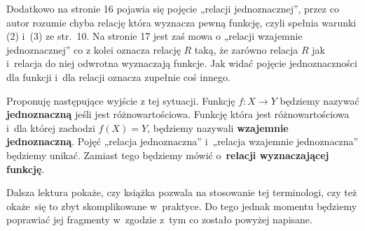 \documentclass[a4paper,11pt]{article}
\numberwithin{equation}{section}
\begin{document}
Dodatkowo na stronie 16 pojawia się pojęcie „relacji jednoznacznej”,
przez co autor rozumie chyba relację która wyznacza pewną funkcję,
czyli spełnia warunki (2) i~(3) ze str.~10. Na stronie 17 jest zaś
mowa o „relacji wzajemnie jednoznacznej” co z kolei oznacza relację
$R$ taką, że zarówno relacja $R$ jak i~relacja do niej odwrotna
wyznaczają funkcje. Jak widać pojęcie jednoznaczności dla funkcji
i~dla relacji oznacza zupełnie coś innego.

Proponuję następujące wyjście z tej sytuacji. Funkcję $f: X \to Y$
będziemy nazywać \textbf{jednoznaczną} jeśli jest różnowartościowa.
Funkcję która jest różnowartościowa i~dla której zachodzi
$f( X ) = Y$, będziemy nazywali \textbf{wzajemnie jednoznaczną}. Pojęć
„relacja jednoznaczna” i~„relacja wzajemnie jednoznaczna” będziemy
unikać. Zamiast tego będziemy mówić o~\textbf{relacji wyznaczającej funkcję}.

Dalsza lektura pokaże, czy książka pozwala na stosowanie tej
terminologi, czy też okaże~się to zbyt skomplikowane w~praktyce. Do
tego jednak momentu będziemy poprawiać jej fragmenty w~zgodzie z~tym
co zostało powyżej napisane.






\newpage

\end{document}
